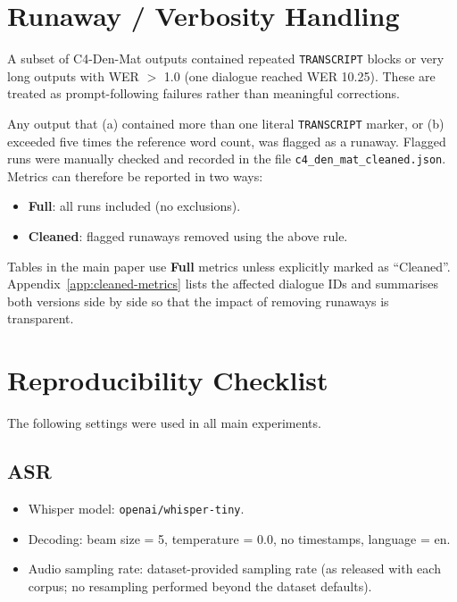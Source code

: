 \documentclass[11pt,a4paper]{article}
\begin{document}
\appendix

\section{Runaway / Verbosity Handling}
\label{app:verbosity}

A subset of C4-Den-Mat outputs contained repeated \texttt{TRANSCRIPT} blocks or
very long outputs with WER $>$ 1.0 (one dialogue reached WER 10.25). These are
treated as prompt-following failures rather than meaningful corrections.

Any output that (a) contained more than one literal \texttt{TRANSCRIPT}
marker, or (b) exceeded five times the reference word count, was flagged as a
runaway. Flagged runs were manually checked and recorded in the file
\texttt{c4\_den\_mat\_cleaned.json}. Metrics can therefore be reported in two
ways:
\begin{itemize}[leftmargin=1.4em]
  \item \textbf{Full}: all runs included (no exclusions).
  \item \textbf{Cleaned}: flagged runaways removed using the above rule.
\end{itemize}
Tables in the main paper use \textbf{Full} metrics unless explicitly marked as
``Cleaned''. Appendix~\ref{app:cleaned-metrics} lists the affected dialogue
IDs and summarises both versions side by side so that the impact of removing
runaways is transparent.

\section{Reproducibility Checklist}
\label{app:repro}

The following settings were used in all main experiments.

\subsection*{ASR}
\begin{itemize}[leftmargin=1.4em]
  \item Whisper model: \texttt{openai/whisper-tiny}.
  \item Decoding: beam size = 5, temperature = 0.0, no timestamps, language = en.
  \item Audio sampling rate: dataset-provided sampling rate (as released with
        each corpus; no resampling performed beyond the dataset defaults).
\end{itemize}
\end{document}
